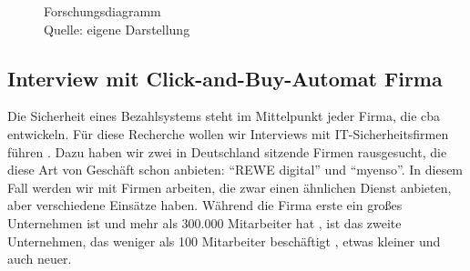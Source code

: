 \begin{figure}[H]
  \caption{Forschungsdiagramm
  \\ Quelle: eigene Darstellung}
  \label{fig:FD}
\end{figure}

%






\subsection{Interview mit Click-and-Buy-Automat Firma}

Die Sicherheit eines Bezahlsystems steht im Mittelpunkt jeder Firma, die \acrfull{cba} entwickeln. Für diese Recherche wollen
wir Interviews mit IT-Sicherheitsfirmen führen \cite{refbook:FWDL}. Dazu haben wir zwei in Deutschland sitzende
Firmen rausgesucht, die diese Art von Geschäft schon anbieten: ``REWE digital'' und ``myenso''. In diesem Fall werden wir mit Firmen 
arbeiten, die zwar einen ähnlichen Dienst anbieten, aber verschiedene Einsätze haben. Während die Firma erste ein großes Unternehmen
ist und mehr als 300.000 Mitarbeiter hat \cite{refst:REWE}, ist das zweite Unternehmen, das weniger
als 100 Mitarbeiter beschäftigt \cite{refst:MYENSO}, etwas kleiner und auch neuer.

